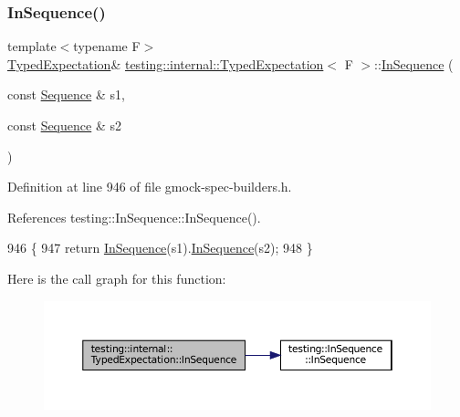 \subsubsection{\texorpdfstring{In\+Sequence()}{InSequence()}\hspace{0.1cm}{\footnotesize\ttfamily [2/5]}}
{\footnotesize\ttfamily template$<$typename F$>$ \\
\hyperlink{classtesting_1_1internal_1_1TypedExpectation}{Typed\+Expectation}\& \hyperlink{classtesting_1_1internal_1_1TypedExpectation}{testing\+::internal\+::\+Typed\+Expectation}$<$ F $>$\+::\hyperlink{classtesting_1_1InSequence}{In\+Sequence} (\begin{DoxyParamCaption}\item[{const \hyperlink{classtesting_1_1Sequence}{Sequence} \&}]{s1,  }\item[{const \hyperlink{classtesting_1_1Sequence}{Sequence} \&}]{s2 }\end{DoxyParamCaption})\hspace{0.3cm}{\ttfamily [inline]}}



Definition at line 946 of file gmock-\/spec-\/builders.\+h.



References testing\+::\+In\+Sequence\+::\+In\+Sequence().


\begin{DoxyCode}
946                                                                        \{
947     \textcolor{keywordflow}{return} \hyperlink{classtesting_1_1internal_1_1TypedExpectation_ada9e9081a98435991310ac60483d1230}{InSequence}(s1).\hyperlink{classtesting_1_1internal_1_1TypedExpectation_ada9e9081a98435991310ac60483d1230}{InSequence}(s2);
948   \}
\end{DoxyCode}
Here is the call graph for this function\+:
\nopagebreak
\begin{figure}[H]
\begin{center}
\leavevmode
\includegraphics[width=350pt]{classtesting_1_1internal_1_1TypedExpectation_ac0f45c73e3f816796f6c5dea2dc70131_cgraph}
\end{center}
\end{figure}
\mbox{\label{classtesting_1_1internal_1_1TypedExpectation_a17cfbb9db111e0ded254759664e78d73}} 
